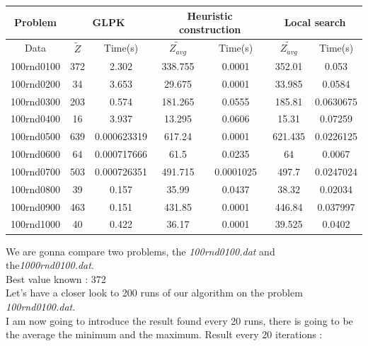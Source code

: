 \documentclass[12pt]{article}
\begin{document}
	\begin{center}
		\begin{tabular}{|c|c|c|c|c|c|c|}
			\hline
			Problem & \multicolumn{2}{|c|}{GLPK} & \multicolumn{2}{|c|}{Heuristic construction} & \multicolumn{2}{|c|}{Local search}\\
			\hline
			Data  &  $\tilde{Z}$ & Time(s) & $\tilde{Z_{avg}}$ & Time(s)& $\tilde{Z_{avg}}$ & Time(s) \\
			\hline
			100rnd0100  & 372 & 2.302 & 338.755 & 0.0001 &  352.01 & 0.053 \\
			\hline
			100rnd0200  & 34  & 3.653 & 29.675  &  0.0001 &  33.985 & 0.0584 \\
			\hline
			100rnd0300  & 203   & 0.574 & 181.265   & 0.0555 & 185.81 & 0.0630675\\
			\hline
			100rnd0400 & 16    & 3.937 & 13.295    & 0.0606 & 15.31 & 0.07259\\
			\hline
			
			100rnd0500  & 639     & 0.000623319 & 617.24     & 0.0001 & 621.435 & 0.0226125\\
			\hline
			
			100rnd0600  & 64     &  0.000717666 & 61.5     & 0.0235 & 64 & 0.0067\\
			\hline
			
			100rnd0700  & 503      &  0.000726351 & 491.715 & 0.0001025 & 497.7 & 0.0247024\\
			\hline
			
			100rnd0800  & 39      &  0.157 & 35.99 & 0.0437 &38.32 & 0.02034\\
			\hline
			
			100rnd0900  & 463       &  0.151 & 431.85     & 0.0001 & 446.84 & 0.037997\\
			\hline
			
			100rnd1000  & 40       &  0.422 & 36.17     & 0.0001 & 39.525 & 0.0402\\
			\hline
		\end{tabular}
	\end{center}
	We are gonna compare two problems, the \textit{100rnd0100.dat} and the\textit{1000rnd0100.dat}.\\
	Best value known : 372 \\
 	Let's have a closer look to 200 runs of our algorithm on the problem \textit{100rnd0100.dat}.\\
	I am now going to introduce the result found every 20 runs, there is going to be the average the minimum and the maximum.
	Result every 20 iterations : 
\end{document}

